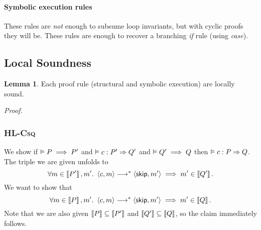 \documentclass[10pt]{article}
\theoremstyle{definition}
\newtheorem{lemma}{Lemma}
\begin{document}
\paragraph{Symbolic execution rules}





\noindent
These rules are \emph{not} enough to subsume loop invariants, but with cyclic proofs they will be.
These rules are enough to recover a branching \emph{if} rule (using \emph{case}).




\subsection*{Local Soundness}


\begin{lemma}
    Each proof rule (structural and symbolic execution) are locally sound.
\end{lemma}

\noindent
\emph{Proof.}

\subsubsection*{\textsc{HL-Csq}}
We show if $\vDash P \implies P'$ and 
      $\VAL \Triple c : P' => Q'$ and 
      $\vDash Q' \implies Q$
then $\VAL \Triple c : P => Q$.
The triple we are given unfolds to
\[
    \forall m \in \Interp{P'}, m'.\
    \Cfg(c, m) \sstepstotrans \Cfg(\Skip, m')
    \implies m' \in \Interp{Q'}.
\]
We want to show that
\[
    \forall m \in \Interp P, m'.\
    \Cfg(c, m) \sstepstotrans \Cfg(\Skip, m')
    \implies m' \in \Interp Q.
\]
Note that we are also given $\left\llbracket P \right\rrbracket \subseteq \left\llbracket P' \right\rrbracket$ and $\left\llbracket Q' \right\rrbracket \subseteq \left\llbracket Q \right\rrbracket$,
so the claim immediately follows.
\end{document}
